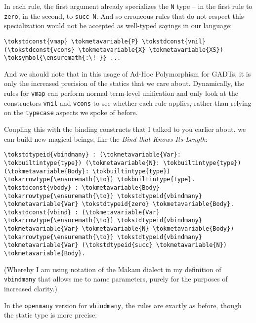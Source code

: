 In each rule, the first argument already specializes the \texttt{N} type
-- in the first rule to \texttt{zero}, in the second, to
\texttt{succ\ N}. And so erroneous rules that do not respect this
specialization would not be accepted as well-typed sayings in our
language:

\begin{verbatim}
\tokstdconst{vmap} \tokmetavariable{P} \tokstdconst{vnil} (\tokstdconst{vcons} \tokmetavariable{X} \tokmetavariable{XS}) \toksymbol{\ensuremath{:\!-}} ...
\end{verbatim}

And we should note that in this usage of Ad-Hoc Polymorphism for GADTs,
it is only the increased precision of the statics that we care about.
Dynamically, the rules for \texttt{vmap} can perform normal term-level
unification and only look at the constructors \texttt{vnil} and
\texttt{vcons} to see whether each rule applies, rather than relying on
the \texttt{typecase} aspects we spoke of before.

Coupling this with the binding constructs that I talked to you earlier
about, we can build new magical beings, like the \emph{Bind that Knows
Its Length}:

\importantCodeblock{}

\begin{verbatim}
\tokstdtypeid{vbindmany} : (\tokmetavariable{Var}: \tokbuiltintype{type}) (\tokmetavariable{N}: \tokbuiltintype{type}) (\tokmetavariable{Body}: \tokbuiltintype{type}) \tokarrowtype{\ensuremath{\to}} \tokbuiltintype{type}.
\tokstdconst{vbody} : \tokmetavariable{Body} \tokarrowtype{\ensuremath{\to}} \tokstdtypeid{vbindmany} \tokmetavariable{Var} \tokstdtypeid{zero} \tokmetavariable{Body}.
\tokstdconst{vbind} : (\tokmetavariable{Var} \tokarrowtype{\ensuremath{\to}} \tokstdtypeid{vbindmany} \tokmetavariable{Var} \tokmetavariable{N} \tokmetavariable{Body}) \tokarrowtype{\ensuremath{\to}} \tokstdtypeid{vbindmany} \tokmetavariable{Var} (\tokstdtypeid{succ} \tokmetavariable{N}) \tokmetavariable{Body}.
\end{verbatim}

\importantCodeblockEnd{}

(Whereby I am using notation of the Makam dialect in my definition of
\texttt{vbindmany} that allows me to name parameters, purely for the
purposes of increased clarity.)

In the \texttt{openmany} version for \texttt{vbindmany}, the rules are
exactly as before, though the static type is more precise:

